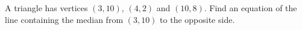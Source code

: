 A triangle has vertices $(3,10)$, $(4,2)$ and $(10,8)$. Find an equation of the line containing the median from $(3,10)$ to the opposite side.
